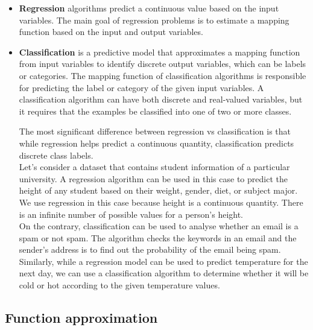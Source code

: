 \begin{tcolorbox}[width=\textwidth,colback={white},title={Classification vs Regression },colbacktitle=cyan,coltitle=black]
	\begin{itemize}
			\item \textbf{Regression} algorithms predict a continuous value based on the input variables. The main goal of regression problems is to estimate a mapping function based on the input and output variables.
			\item \textbf{Classification} is a predictive model that approximates a mapping function from input variables to identify discrete output variables, which can be labels or categories. The mapping function of classification algorithms is responsible for predicting the label or category of the given input variables. A classification algorithm can have both discrete and real-valued variables, but it requires that the examples be classified into one of two or more classes.

The most significant difference between regression vs classification is that while regression helps predict a continuous quantity, classification predicts discrete class labels. \\

Let’s consider a dataset that contains student information of a particular university. A regression algorithm can be used in this case to predict the height of any student based on their weight, gender, diet, or subject major. We use regression in this case because height is a continuous quantity. There is an infinite number of possible values for a person’s height.\\

On the contrary, classification can be used to analyse whether an email is a spam or not spam. The algorithm checks the keywords in an email and the sender’s address is to find out the probability of the email being spam. Similarly, while a regression model can be used to predict temperature for the next day, we can use a classification algorithm to determine whether it will be cold or hot according to the given temperature values. 
	\end{itemize} 
\end{tcolorbox}

\subsection{Function approximation}

